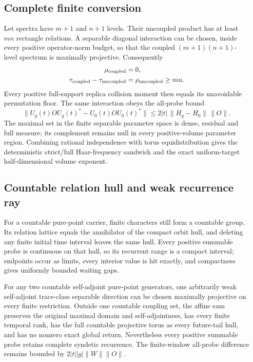 \subsection{Complete finite conversion}

Let spectra have $m+1$ and $n+1$ levels.  Their uncoupled product has at
least $mn$ rectangle relations.  A separable diagonal interaction can be
chosen, inside every positive operator-norm budget, so that the coupled
$(m+1)(n+1)$-level spectrum is maximally projective.  Consequently
\begin{align*}
 \rho_{\rm coupled}&=0,\\
 \tau_{\rm coupled}-\tau_{\rm uncoupled}&=\rho_{\rm uncoupled}\ge mn.
\end{align*}
Every positive full-support replica collision moment then equals its
unavoidable permutation floor.  The same interaction obeys the all-probe
bound
\[
 \|U_g(t)OU_g(t)^*-U_0(t)OU_0(t)^*\|
 \le2|t|\,\|H_g-H_0\|\,\|O\|.
\]
The maximal set in the finite separable parameter space is dense, residual
and full measure; its complement remains null in every positive-volume
parameter region.  Combining rational independence with torus
equidistribution gives the deterministic strict/full Haar-frequency
sandwich and the exact uniform-target half-dimensional volume exponent.

\subsection{Countable relation hull and weak recurrence ray}

For a countable pure-point carrier, finite characters still form a countable
group.  Its relation lattice equals the annihilator of the compact orbit
hull, and deleting any finite initial time interval leaves the same hull.
Every positive summable probe is continuous on that hull, so its recurrent
range is a compact interval; endpoints occur as limits, every interior value
is hit exactly, and compactness gives uniformly bounded waiting gaps.

For any two countable self-adjoint pure-point generators, one arbitrarily weak
self-adjoint trace-class separable direction can be chosen maximally
projective on every finite restriction.  Outside one countable coupling set,
the affine sum preserves the original maximal domain and self-adjointness,
has every finite temporal rank, has the full countable projective torus as
every future-tail hull, and has no nonzero exact global return.  Nevertheless
every positive summable probe retains complete syndetic recurrence.  The
finite-window all-probe difference remains bounded by
$2|t||g|\|W\|\|O\|$.

